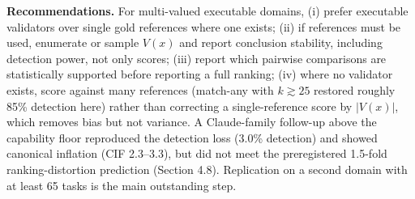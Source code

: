 \documentclass[11pt]{article}
\begin{document}
\textbf{Recommendations.} For multi-valued executable domains, (i) prefer executable validators over single gold references where one exists; (ii) if references must be used, enumerate or sample $V(x)$ and report conclusion stability, including detection power, not only scores; (iii) report which pairwise comparisons are statistically supported before reporting a full ranking; (iv) where no validator exists, score against many references (match-any with $k \gtrsim 25$ restored roughly 85\% detection here) rather than correcting a single-reference score by $|V(x)|$, which removes bias but not variance. A Claude-family follow-up above the capability floor reproduced the detection loss (3.0\% detection) and showed canonical inflation (CIF 2.3--3.3), but did not meet the preregistered 1.5-fold ranking-distortion prediction (Section 4.8). Replication on a second domain with at least 65 tasks is the main outstanding step.
\end{document}
